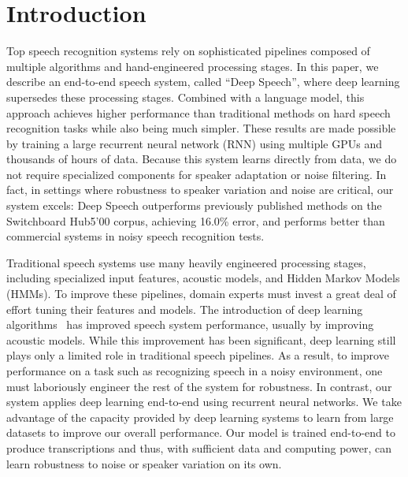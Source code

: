 \section{Introduction}
\label{sec:deepspeech:introduction}

Top speech recognition systems rely on sophisticated pipelines composed of
multiple algorithms and hand-engineered processing stages. In this paper, we
describe an end-to-end speech system, called ``Deep Speech'', where deep
learning supersedes these processing stages. Combined with a language model,
this approach achieves higher performance than traditional methods on hard
speech recognition tasks while also being much simpler. These results are made
possible by training a large recurrent neural network (RNN) using multiple GPUs
and thousands of hours of data. Because this system learns directly from data,
we do not require specialized components for speaker adaptation or noise
filtering. In fact, in settings where robustness to speaker variation and noise
are critical, our system excels: Deep Speech outperforms previously published
methods on the Switchboard Hub5'00 corpus, achieving 16.0\% error, and performs
better than commercial systems in noisy speech recognition tests.

Traditional speech systems use many heavily engineered processing stages,
including specialized input features, acoustic models, and Hidden Markov Models
(HMMs). To improve these pipelines, domain experts must invest a great deal of
effort tuning their features and models. The introduction of deep learning
algorithms~\cite{lee2009, mohamed2011, hinton2012, dahl2011a} has improved
speech system performance, usually by improving acoustic models.  While this
improvement has been significant, deep learning still plays only a limited role
in traditional speech pipelines. As a result, to improve performance on a task
such as recognizing speech in a noisy environment, one must laboriously
engineer the rest of the system for robustness. In contrast, our system applies
deep learning end-to-end using recurrent neural networks.  We take advantage of
the capacity provided by deep learning systems to learn from large datasets to
improve our overall performance. Our model is trained end-to-end to produce
transcriptions and thus, with sufficient data and computing power, can learn
robustness to noise or speaker variation on its own.

